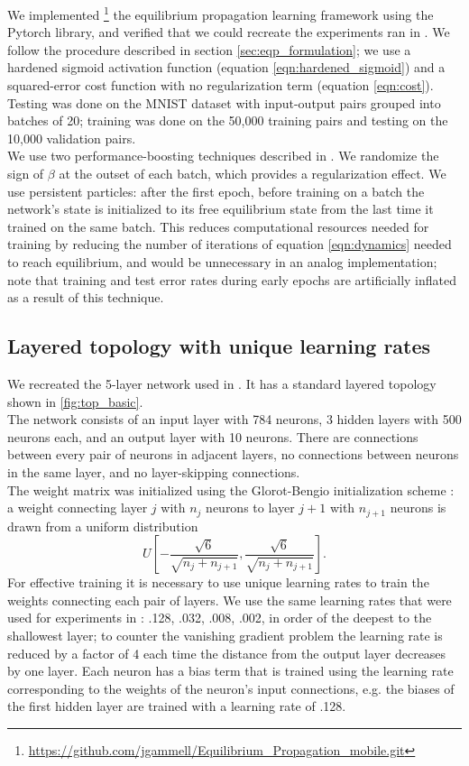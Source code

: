 \documentclass[format=sigconf]{acmart}
\newcommand{\npar}{\\\indent}
\begin{document}
We implemented
\footnote{\url{https://github.com/jgammell/Equilibrium_Propagation_mobile.git}}
 the equilibrium propagation learning framework \cite{scellier17} using the Pytorch library, and verified that we could recreate the experiments ran in \cite{scellier17}. We follow the procedure described in section \ref{sec:eqp_formulation}; we use a hardened sigmoid activation function (equation \ref{eqn:hardened_sigmoid}) and a squared-error cost function with no regularization term (equation \ref{eqn:cost}). Testing was done on the MNIST dataset \cite{mnist1998} with input-output pairs grouped into batches of 20; training was done on the 50,000 training pairs and testing on the 10,000 validation pairs.
\npar
We use two performance-boosting techniques described in \cite{scellier17}. We randomize the sign of $\beta$ at the outset of each batch, which provides a regularization effect. We use persistent particles: after the first epoch, before training on a batch the network's state is initialized to its free equilibrium state from the last time it trained on the same batch. This reduces computational resources needed for training by reducing the number of iterations of equation \ref{eqn:dynamics} needed to reach equilibrium, and would be unnecessary in an analog implementation; note that training and test error rates during early epochs are artificially inflated as a result of this technique.

\subsection{Layered topology with unique learning rates}
\label{sec:basic_topology}

We recreated the 5-layer network used in \cite{scellier17}. It has a standard layered topology shown in \ref{fig:top_basic}.
\npar
The network consists of an input layer with 784 neurons, 3 hidden layers with 500 neurons each, and an output layer with 10 neurons. There are connections between every pair of neurons in adjacent layers, no connections between neurons in the same layer, and no layer-skipping connections.
\npar
The weight matrix was initialized using the Glorot-Bengio initialization scheme \cite{glorot2010}: a weight connecting layer $j$ with $n_j$ neurons to layer $j+1$ with $n_{j+1}$ neurons is drawn from a uniform distribution
\begin{equation}
\label{eqn:gb_init}
U[-\frac{\sqrt{6}}{\sqrt{n_j+n_{j+1}}},\frac{\sqrt{6}}{\sqrt{n_j+n_{j+1}}}].
\end{equation}
For effective training it is necessary to use unique learning rates to train the weights connecting each pair of layers. We use the same learning rates that were used for experiments in \cite{scellier17}: .128, .032, .008, .002, in order of the deepest to the shallowest layer; to counter the vanishing gradient problem the learning rate is reduced by a factor of 4 each time the distance from the output layer decreases by one layer. Each neuron has a bias term that is trained using the learning rate corresponding to the weights of the neuron's input connections, e.g. the biases of the first hidden layer are trained with a learning rate of .128.
\end{document}
